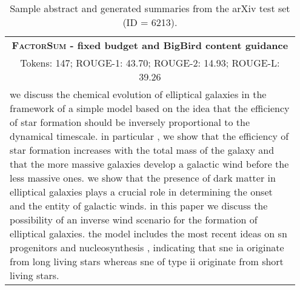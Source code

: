 \documentclass[11pt,table]{article}
\newcommand{\modelname}{FactorSum}
\begin{document}
\begin{table*}[ht]
\begin{tabular}{p{0.95\linewidth}}
    \midrule
    \multicolumn{1}{c}{\textbf{\textsc{\modelname} - fixed budget and BigBird content guidance}} \\
    \multicolumn{1}{c}{Tokens: 147; ROUGE-1: 43.70; ROUGE-2: 14.93; ROUGE-L: 39.26} \\
    \midrule
    we discuss the chemical evolution of elliptical galaxies in the framework of a simple model based on the idea that the efficiency of star formation should be inversely proportional to the dynamical timescale. in particular , we show that the efficiency of star formation increases with the total mass of the galaxy and that the more massive galaxies develop a galactic wind before the less massive ones. we show that the presence of dark matter in elliptical galaxies plays a crucial role in determining the onset and the entity of galactic winds. in this paper we discuss the possibility of an inverse wind scenario for the formation of elliptical galaxies. the model includes the most recent ideas on sn progenitors and nucleosynthesis , indicating that sne ia originate from long living stars whereas sne of type ii originate from short living stars.\\
    \bottomrule
  \end{tabular}
  \caption{Sample abstract and generated summaries from the arXiv test set (ID = 6213).} \label{tab:summary_sample_arxiv2}
\end{table*}
\end{document}
